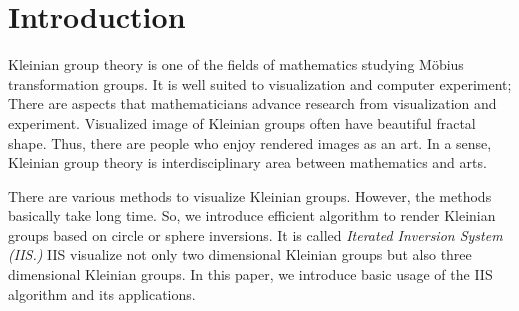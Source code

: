 
\section{Introduction}

Kleinian group theory is one of the fields of mathematics studying 
M\"obius transformation groups.
It is well suited to visualization and computer experiment;
There are aspects that mathematicians advance research from
visualization and experiment.
Visualized image of Kleinian groups often have beautiful fractal shape.
Thus, there are people who enjoy rendered images as an art.
In a sense, Kleinian group theory is interdisciplinary area between
mathematics and arts.

There are various methods to visualize Kleinian groups.
However, the methods basically take long time.
So, we introduce efficient algorithm to render Kleinian groups based on
circle or sphere inversions.
It is called \textit{Iterated Inversion System (IIS.)} 
IIS visualize not only two dimensional Kleinian groups but also three
dimensional Kleinian groups.
In this paper, we introduce basic usage of the IIS algorithm and its
applications.
